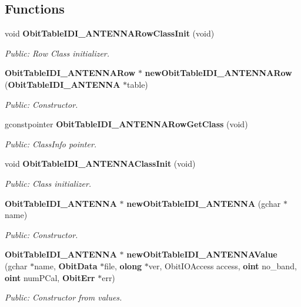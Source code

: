 \subsection*{Functions}
\begin{CompactItemize}
\item 
void {\bf Obit\-Table\-IDI\_\-ANTENNARow\-Class\-Init} (void)
\begin{CompactList}\small\item\em Public: Row Class initializer. \item\end{CompactList}\item 
{\bf Obit\-Table\-IDI\_\-ANTENNARow} $\ast$ {\bf new\-Obit\-Table\-IDI\_\-ANTENNARow} ({\bf Obit\-Table\-IDI\_\-ANTENNA} $\ast$table)
\begin{CompactList}\small\item\em Public: Constructor. \item\end{CompactList}\item 
gconstpointer {\bf Obit\-Table\-IDI\_\-ANTENNARow\-Get\-Class} (void)
\begin{CompactList}\small\item\em Public: Class\-Info pointer. \item\end{CompactList}\item 
void {\bf Obit\-Table\-IDI\_\-ANTENNAClass\-Init} (void)
\begin{CompactList}\small\item\em Public: Class initializer. \item\end{CompactList}\item 
{\bf Obit\-Table\-IDI\_\-ANTENNA} $\ast$ {\bf new\-Obit\-Table\-IDI\_\-ANTENNA} (gchar $\ast$name)
\begin{CompactList}\small\item\em Public: Constructor. \item\end{CompactList}\item 
{\bf Obit\-Table\-IDI\_\-ANTENNA} $\ast$ {\bf new\-Obit\-Table\-IDI\_\-ANTENNAValue} (gchar $\ast$name, {\bf Obit\-Data} $\ast$file, {\bf olong} $\ast$ver, Obit\-IOAccess access, {\bf oint} no\_\-band, {\bf oint} num\-PCal, {\bf Obit\-Err} $\ast$err)
\begin{CompactList}\small\item\em Public: Constructor from values. \item\end{CompactList}\item 

\end{CompactItemize}
